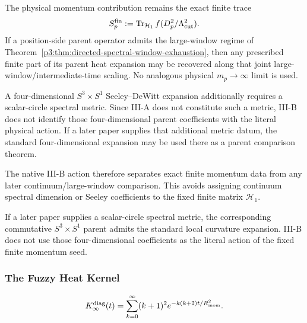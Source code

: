 \documentclass[12pt,a4paper]{article}
\begin{document}
\begin{theorem}
\label{p3:thm:hk_sectorwise}
The physical momentum contribution remains the exact finite trace
\[
 S_p^{\rm fin}:=\operatorname{Tr}_{\mathcal H_1}f(D_p^2/\Lambda_{\mathrm{cut}}^2).
\]
If a position-side parent operator admits the large-window regime of
Theorem~\ref{p3:thm:directed-spectral-window-exhaustion}, then any prescribed
finite part of its parent heat expansion may be recovered along that joint
large-window/intermediate-time scaling.  No analogous physical
\(m_p\to\infty\) limit is used.

A four-dimensional \(S^3\times S^1\) Seeley--DeWitt expansion additionally
requires a scalar-circle spectral metric.  Since III-A does not constitute
such a metric, III-B does not identify those four-dimensional parent
coefficients with the literal physical action.  If a later paper supplies
that additional metric datum, the standard four-dimensional expansion may be
used there as a parent comparison theorem.
\end{theorem}

\begin{remark}
The native III-B action therefore separates exact finite momentum data from
any later continuum/large-window comparison.  This avoids assigning
continuum spectral dimension or Seeley coefficients to the fixed finite
matrix \(\mathcal H_1\).
\end{remark}

\begin{remark}
If a later paper supplies a scalar-circle spectral metric, the corresponding
commutative $S^3\times S^1$ parent admits the standard local curvature
expansion.  III-B does not use those four-dimensional coefficients as the
literal action of the fixed finite momentum seed.
\end{remark}


\subsubsection{The Fuzzy Heat Kernel}

\begin{definition}
\begin{equation}
K_\infty^{\rm diag}(t) = \sum_{k=0}^{\infty} (k+1)^2 e^{-k(k+2)t/R_{\mathrm{mom}}^2}.
\end{equation}
\end{definition}
\end{document}
